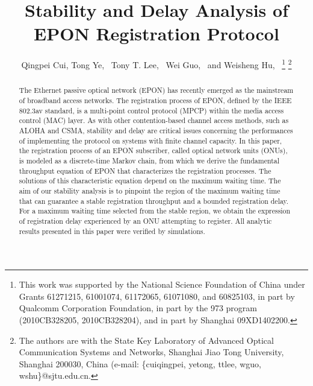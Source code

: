 \documentclass[journal]{IEEEtran}
\begin{document}
\title{Stability and Delay Analysis of EPON Registration Protocol}


\author{Qingpei Cui,
        Tong Ye,~
        Tony T. Lee,~
        Wei Guo,~
        and Weisheng Hu,~
\thanks{This work was supported by the National Science Foundation of China under Grants 61271215, 61001074, 61172065, 61071080, and 60825103, in part by Qualcomm Corporation Foundation, in part by the 973 program (2010CB328205, 2010CB328204), and in part by Shanghai 09XD1402200.}
\thanks{The authors are with the State Key Laboratory of Advanced Optical Communication Systems and Networks, Shanghai Jiao Tong University, Shanghai 200030, China (e-mail: \{cuiqingpei, yetong, ttlee, wguo, wshu\}@sjtu.edu.cn.
}}


\maketitle

\begin{abstract}
The Ethernet passive optical network (EPON) has recently emerged as the mainstream of broadband access networks. The registration process of EPON, defined by the IEEE 802.3av standard, is a multi-point control protocol (MPCP) within the media access control (MAC) layer. As with other contention-based channel access methods, such as ALOHA and CSMA, stability and delay are critical issues concerning the performances of implementing the protocol on systems with finite channel capacity. In this paper, the registration process of an EPON subscriber, called optical network units (ONUs), is modeled as a discrete-time Markov chain, from which we derive the fundamental throughput equation of EPON that characterizes the registration processes. The solutions of this characteristic equation depend on the maximum waiting time. The aim of our stability analysis is to pinpoint the region of the maximum waiting time that can guarantee a stable registration throughput and a bounded registration delay. For a maximum waiting time selected from the stable region, we obtain the expression of registration delay experienced by an ONU attempting to register. All analytic results presented in this paper were verified by simulations.
\end{abstract}
\end{document}
